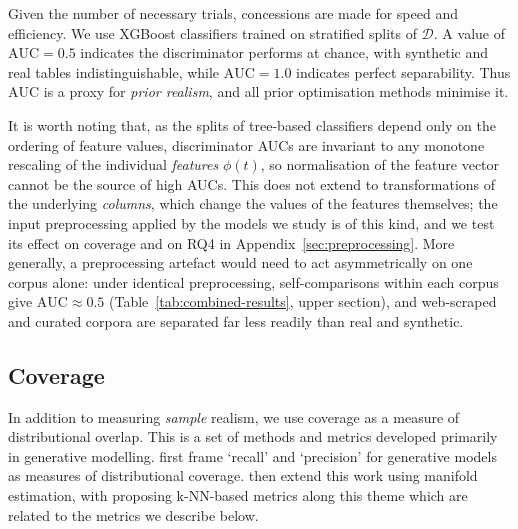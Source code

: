 \documentclass{article}
\begin{document}
Given the number of necessary trials, concessions are made for speed and efficiency.
We use XGBoost classifiers trained on stratified splits of $\mathcal{D}$. 
A value of $\text{AUC} = 0.5$ indicates the discriminator performs at chance, with synthetic and real tables indistinguishable, while $\text{AUC} = 1.0$ indicates perfect separability. 
Thus $\text{AUC}$ is a proxy for \emph{prior realism}, and all prior optimisation methods minimise it.

It is worth noting that, as the splits of tree-based classifiers depend only on the ordering of feature values, discriminator AUCs are invariant to any monotone rescaling of the individual \textit{features} $\phi(t)$, so normalisation of the feature vector cannot be the source of high AUCs.
This does not extend to transformations of the underlying \textit{columns}, which change the values of the features themselves; the input preprocessing applied by the models we study is of this kind, and we test its effect on coverage and on RQ4 in Appendix~\ref{sec:preprocessing}.
More generally, a preprocessing artefact would need to act asymmetrically on one corpus alone: under identical preprocessing, self-comparisons within each corpus give $\text{AUC} \approx 0.5$ (Table~\ref{tab:combined-results}, upper section), and web-scraped and curated corpora are separated far less readily than real and synthetic.


\subsection{Coverage}


In addition to measuring  \textit{sample} realism, we use coverage as a measure of distributional overlap.
This is a set of methods and metrics developed primarily in generative modelling.
\citet{sajjadiAssessingGenerativeModels2018} first frame `recall' and `precision' for generative models as measures of distributional coverage.
\citet{kynkaanniemiImprovedPrecisionRecall2019} then extend this work using manifold estimation, with \citet{naeemReliableFidelityDiversity2020} proposing k-NN-based metrics along this theme which are  related to the metrics we describe below.
\end{document}
